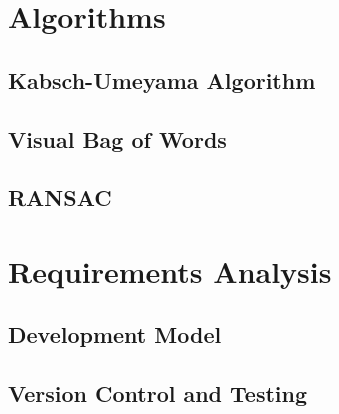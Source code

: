 \section{Algorithms}
\label{sec:algorithms}

\subsection{Kabsch-Umeyama Algorithm}
\label{sec:kabsch-umeyama-algorithm}

\subsection{Visual Bag of Words}
\label{sec:visual-bag-of-words}

\subsection{RANSAC}
\label{sec:ransac}

\section{Requirements Analysis}
\label{sec:requirements-analysis}

\subsection{Development Model}
\label{sec:development-model}

\subsection{Version Control and Testing}
\label{sec:version-control-and-testing}

